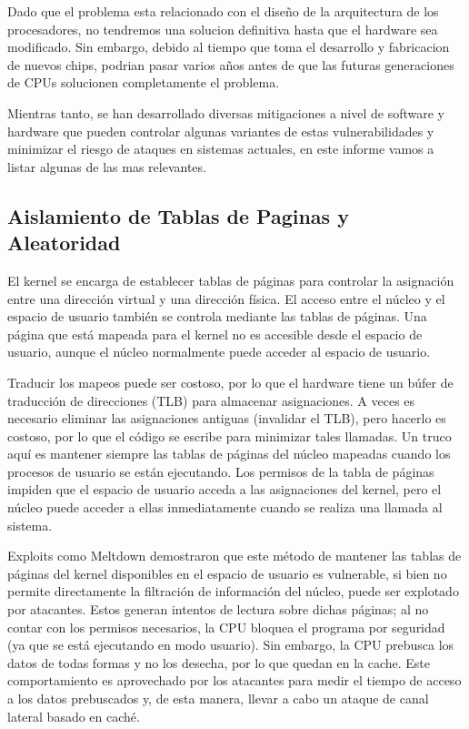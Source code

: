\documentclass[lettersize,compsoc]{IEEEtran}
\begin{document}
Dado que el problema esta relacionado con el diseño de la arquitectura de los procesadores, no tendremos una solucion definitiva hasta que el hardware sea modificado. Sin embargo, debido al tiempo que toma el desarrollo y fabricacion de nuevos chips, podrian pasar varios años antes de que las futuras generaciones de CPUs solucionen completamente el problema.

Mientras tanto, se han desarrollado diversas mitigaciones a nivel de software y hardware que pueden controlar algunas variantes de estas vulnerabilidades y minimizar el riesgo de ataques en sistemas actuales, en este informe vamos a listar algunas de las mas relevantes.

\subsection{Aislamiento de Tablas de Paginas y Aleatoridad}
El kernel se encarga de establecer tablas de páginas para controlar la asignación entre una dirección virtual y una dirección física. El acceso entre el núcleo y el espacio de usuario también se controla mediante las tablas de páginas. Una página que está mapeada para el kernel no es accesible desde el espacio de usuario, aunque el núcleo normalmente puede acceder al espacio de usuario.

Traducir los mapeos puede ser costoso, por lo que el hardware tiene un búfer de traducción de direcciones (TLB) para almacenar asignaciones. A veces es necesario eliminar las asignaciones antiguas (invalidar el TLB), pero hacerlo es costoso, por lo que el código se escribe para minimizar tales llamadas. Un truco aquí es mantener siempre las tablas de páginas del núcleo mapeadas cuando los procesos de usuario se están ejecutando. Los permisos de la tabla de páginas impiden que el espacio de usuario acceda a las asignaciones del kernel, pero el núcleo puede acceder a ellas inmediatamente cuando se realiza una llamada al sistema.

\noindent Exploits como Meltdown demostraron que este método de mantener las tablas de páginas del kernel disponibles en el espacio de usuario es vulnerable, si bien no permite directamente la filtración de información del núcleo, puede ser explotado por atacantes. Estos generan intentos de lectura sobre dichas páginas; al no contar con los permisos necesarios, la CPU bloquea el programa por seguridad (ya que se está ejecutando en modo usuario). Sin embargo, la CPU prebusca los datos de todas formas y no los desecha, por lo que quedan en la cache. Este comportamiento es aprovechado por los atacantes para medir el tiempo de acceso a los datos prebuscados y, de esta manera, llevar a cabo un ataque de canal lateral basado en caché.
\end{document}
